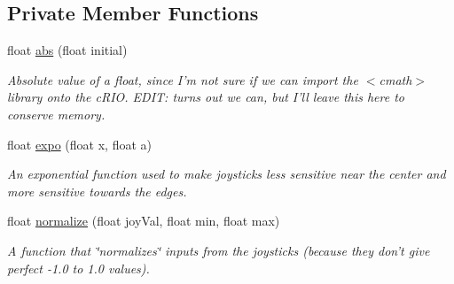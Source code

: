 \subsection*{Private Member Functions}
\begin{DoxyCompactItemize}
\item 
float \hyperlink{class_r_j_f_r_c2011_1_1_controller_a5afdd5e6ca5ce84de229dfd3f1f20f43}{abs} (float initial)
\begin{DoxyCompactList}\small\item\em Absolute value of a float, since I'm not sure if we can import the $<$cmath$>$ library onto the cRIO. EDIT: turns out we can, but I'll leave this here to conserve memory. \item\end{DoxyCompactList}\item 
float \hyperlink{class_r_j_f_r_c2011_1_1_controller_a96652cffa4dd595c766b97993bc25fa9}{expo} (float x, float a)
\begin{DoxyCompactList}\small\item\em An exponential function used to make joysticks less sensitive near the center and more sensitive towards the edges. \item\end{DoxyCompactList}\item 
float \hyperlink{class_r_j_f_r_c2011_1_1_controller_a5638797bbf5fc78741487113ab2eb880}{normalize} (float joyVal, float min, float max)
\begin{DoxyCompactList}\small\item\em A function that \char`\"{}normalizes\char`\"{} inputs from the joysticks (because they don't give perfect -\/1.0 to 1.0 values). \item\end{DoxyCompactList}\end{DoxyCompactItemize}
